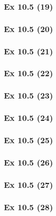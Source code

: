 \subsubsection{Ex 10.5 (19)}\label{sec:Ex_10.5.19}

\subsubsection{Ex 10.5 (20)}\label{sec:Ex_10.5.20}

\newpage		%

\subsubsection{Ex 10.5 (21)}\label{sec:Ex_10.5.21}

\subsubsection{Ex 10.5 (22)}\label{sec:Ex_10.5.22}

\subsubsection{Ex 10.5 (23)}\label{sec:Ex_10.5.23}

\subsubsection{Ex 10.5 (24)}\label{sec:Ex_10.5.24}

\subsubsection{Ex 10.5 (25)}\label{sec:Ex_10.5.25}

\subsubsection{Ex 10.5 (26)}\label{sec:Ex_10.5.26}

\subsubsection{Ex 10.5 (27)}\label{sec:Ex_10.5.27}

\subsubsection{Ex 10.5 (28)}\label{sec:Ex_10.5.28}

\newpage		%








